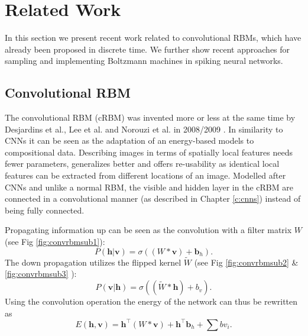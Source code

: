 \chapter{Related Work} \label{c:relwork}

In this section we present recent work related to convolutional RBMs, which have already been proposed in discrete time.
We further show recent approaches for sampling and implementing Boltzmann machines in spiking neural networks.

\section{Convolutional RBM} \label{c:convrbm}

The convolutional RBM (cRBM) was invented more or less at the same time by Desjardins et al., Lee et al. and Norouzi et al. in 2008/2009 \cite{desjardins2008empirical}\cite{lee2009convolutional}\cite{norouzi2009stacks}. 
In similarity to CNNs it can be seen as the adaptation of an energy-based models to compositional data.
Describing images in terms of spatially local features needs fewer parameters, generalizes better and offers re-usability as identical local features can be extracted from different locations of an image.
Modelled after CNNs and unlike a normal RBM, the visible and hidden layer in the cRBM are connected in a convolutional manner (as described in Chapter \ref{c:cnns}) instead of being fully connected.


Propagating information up can be seen as the convolution with a filter matrix $W$ (see Fig \ref{fig:convrbmsub1}): 
\[
P(\textbf{h} | \textbf{v}) = \sigma((W * \textbf{v}) + \textbf{b}_{h}).
\]
The down propagation utilizes the flipped kernel $\tilde{W}$  (see Fig \ref{fig:convrbmsub2} \& \ref{fig:convrbmsub3} ):
\[
P(\textbf{v}| \textbf{h}) = \sigma((\tilde{W} * \textbf{h}) + b_v).
\]
Using the convolution operation the energy of the network can thus be rewritten as
\[
E(\textbf{h} , \textbf{v}) = \textbf{h}^\intercal(W * \textbf{v}) + \textbf{h}^\intercal \textbf{b}_{h} + \sum b v_i.
\]



